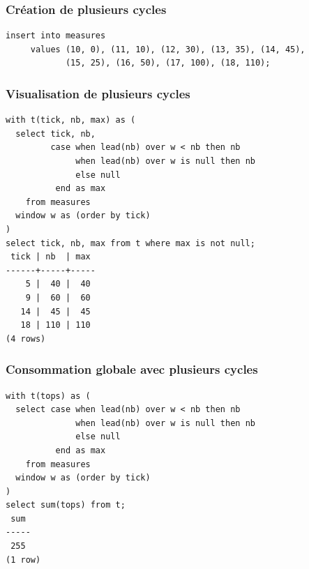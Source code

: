 \documentclass{beamer}
\begin{document}

\begin{frame}[fragile]
  \frametitle{Création de plusieurs cycles}

\begin{verbatim}
insert into measures
     values (10, 0), (11, 10), (12, 30), (13, 35), (14, 45),
            (15, 25), (16, 50), (17, 100), (18, 110);
\end{verbatim}
\end{frame}

\begin{frame}[fragile]
  \frametitle{Visualisation de plusieurs cycles}

\begin{verbatim}
with t(tick, nb, max) as (
  select tick, nb,
         case when lead(nb) over w < nb then nb
              when lead(nb) over w is null then nb
              else null
          end as max
    from measures
  window w as (order by tick)
)
select tick, nb, max from t where max is not null;
 tick | nb  | max 
------+-----+-----
    5 |  40 |  40
    9 |  60 |  60
   14 |  45 |  45
   18 | 110 | 110
(4 rows)
\end{verbatim}
\end{frame}


\begin{frame}[fragile]
  \frametitle{Consommation globale avec plusieurs cycles}

\begin{verbatim}
with t(tops) as (
  select case when lead(nb) over w < nb then nb
              when lead(nb) over w is null then nb
              else null
          end as max
    from measures
  window w as (order by tick)
)
select sum(tops) from t;
 sum 
-----
 255
(1 row)
\end{verbatim}
\end{frame}
\end{document}
